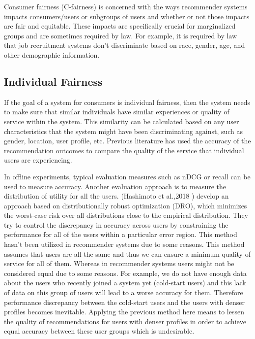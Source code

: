     Consumer fairness (C-fairness) is concerned with the ways recommender systems impacts consumers/users or subgroups of users and whether or not those impacts are fair and equitable. These impacts are specifically crucial for marginalized groups and are sometimes required by law. For example, it is required by law that job recruitment systems don't discriminate based on race, gender, age, and other demographic information.

    \subsection{Individual Fairness}
        If the goal of a system for consumers is individual fairness, then the system needs to make sure that similar individuals have similar experiences or quality of service within the system. This similarity can be calculated based on any user characteristics that the system might have been discriminating against, such as gender, location, user profile, etc. Previous literature has used the accuracy of the recommendation outcomes to compare the quality of the service that individual users are experiencing. 
    
        In offline experiments, typical evaluation measures such as nDCG or recall can be used to measure accuracy. Another evaluation approach is to measure the distribution of utility for all the users. (Hashimoto et al.,2018 \cite{hashimoto2018fairness}) develop an approach based on distributionally robust optimization (DRO), which minimizes the worst-case risk over all distributions close to the empirical distribution. They try to control the discrepancy in accuracy across users by constraining the performance for all of the users within a particular error region. This method hasn't been utilized in recommender systems due to some reasons. This method assumes that users are all the same and thus we can ensure a minimum quality of service for all of them. Whereas in recommender systems users might not be considered equal due to some reasons. For example, we do not have enough data about the users who recently joined a system yet (cold-start users) and this lack of data on this group of users will lead to a worse accuracy for them. Therefore performance discrepancy between the cold-start users and the users with denser profiles becomes inevitable. Applying the previous method here means to lessen the quality of recommendations for users with denser profiles in order to achieve equal accuracy between these user groups which is undesirable.
    
